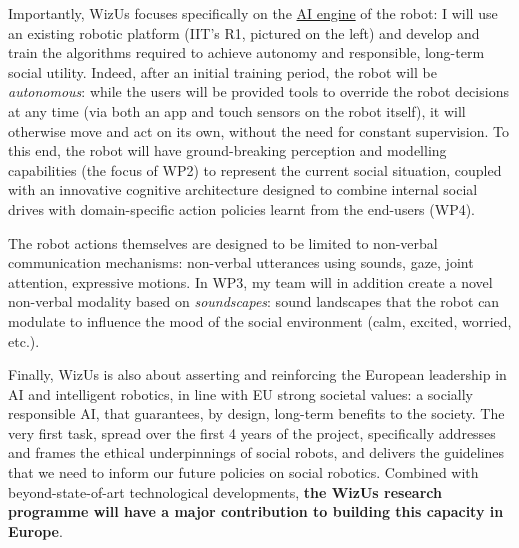 \documentclass[11pt,a4paper]{report}
\newcommand{\project}{WizUs\xspace}
\begin{document}
Importantly, \project focuses specifically on the \ul{AI engine} of the robot: I
will use an existing robotic platform (IIT's R1, pictured on the left) and
develop and train the algorithms required to achieve autonomy and responsible,
long-term social utility. Indeed, after an initial training period, the robot will
be \emph{autonomous}: while the users will be provided tools to override
the robot decisions at any time (via both an app and touch sensors on the robot
itself), it will otherwise move and act on its own, without the need for
constant supervision. To this end, the robot will have ground-breaking
perception and modelling capabilities (the focus of WP2) to represent the
current social situation, coupled with an innovative cognitive architecture
designed to combine internal social drives with domain-specific action policies
learnt from the end-users (WP4).

The robot actions themselves are designed to be limited to non-verbal
communication mechanisms: non-verbal utterances using sounds, gaze, joint
attention, expressive motions. In WP3, my team will in addition create a novel
non-verbal modality based on \emph{soundscapes}: sound landscapes that the robot
can modulate to influence the mood of the social environment (calm, excited,
worried, etc.).

Finally, \project is also about asserting and reinforcing the European
leadership in AI and intelligent robotics, in line with EU strong societal
values: a socially responsible AI, that guarantees, by design, long-term
benefits to the society. The very first task, spread over the first 4 years of
the project, specifically addresses and frames the ethical underpinnings of
social robots, and delivers the guidelines that we need to inform our future
policies on social robotics. Combined with beyond-state-of-art technological
developments, \textbf{the \project research programme will
have a major contribution to building this capacity in Europe}. 
\end{document}
